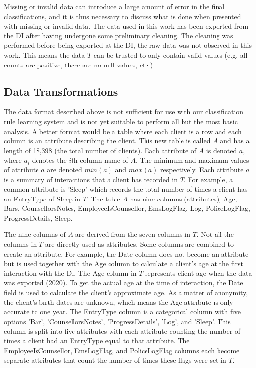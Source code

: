 Missing or invalid data can introduce a large amount of error in the final classifications, and it is thus necessary to discuss what is done when presented with missing or invalid data. The data used in this work has been exported from the DI after having undergone some preliminary cleaning. The cleaning was performed before being exported at the DI, the raw data was not observed in this work. This means the data $T$ can be trusted to only contain valid values (e.g. all counts are positive, there are no null values, etc.). 

\subsection{Data Transformations}

The data format described above is not sufficient for use with our classification rule learning system and is not yet suitable to perform all but the most basic analysis. A better format would be a table where each client is a row and each column is an attribute describing the client.
This new table is called $A$ and has a length of 18,398 (the total number of clients).
Each attribute of $A$ is denoted $a$, where $a_i$ denotes the $i$th column name of $A$. The minimum and maximum values of attribute $a$ are denoted $min(a)$ and $max(a)$ respectively. Each attribute $a$ is a summary of interactions that a client has recorded in $T$. For example, a common attribute is 'Sleep' which records the total number of times a client has an EntryType of Sleep in $T$.
The table $A$ has nine columns (attributes), Age, Bars, CounsellorsNotes, EmployeeIsCounsellor, EmsLogFlag, Log, PoliceLogFlag, ProgressDetails, Sleep.



The nine columns of $A$ are derived from the seven columns in $T$. Not all the columns in $T$ are directly used as attributes. Some columns are combined to create an attribute. For example, the Date column does not become an attribute but is used together with the Age column to calculate a client's age at the first interaction with the DI.
The Age column in $T$ represents client age when the data was exported (2020). To get the actual age at the time of interaction, the Date field is used to calculate the client's approximate age. As a matter of anonymity, the client's birth dates are unknown, which means the Age attribute is only accurate to one year.
The EntryType column is a categorical column with five options 'Bar', 'CounsellorsNotes', 'ProgressDetails', 'Log', and 'Sleep'. This column is split into five attributes with each attribute counting the number of times a client had an EntryType equal to that attribute.
The EmployeeIsCounsellor, EmsLogFlag, and PoliceLogFlag columns each become separate attributes that count the number of times these flags were set in $T$.


